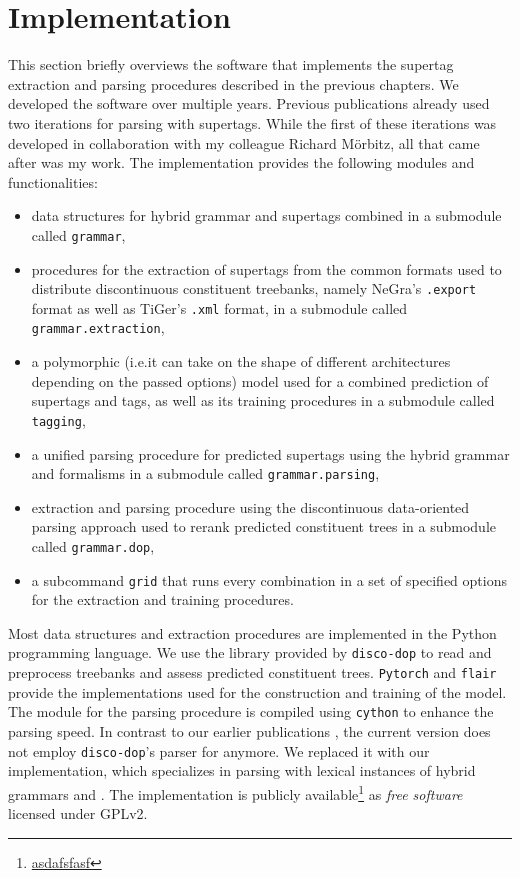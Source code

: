 \documentclass[../../document.tex]{subfiles}
\begin{document}
    \section{Implementation}
    This section briefly overviews the software that implements the supertag extraction and parsing procedures described in the previous chapters.
    We developed the software over multiple years. Previous publications already used two iterations for parsing with  supertags. \citep{RupMoe21,Rup22}
    While the first of these iterations was developed in collaboration with my colleague Richard Mörbitz, all that came after was my work.
    The implementation provides the following modules and functionalities:
    \begin{itemize}
        \item data structures for hybrid grammar and  supertags combined in a submodule called \texttt{grammar},
        \item procedures for the extraction of supertags from the common formats used to distribute discontinuous constituent treebanks, namely NeGra's \texttt{.export} format as well as TiGer's \texttt{.xml} format, in a submodule called \texttt{grammar.extraction},
        \item a polymorphic (i.e.\@ it can take on the shape of different architectures depending on the passed options)  model used for a combined prediction of supertags and  tags, as well as its training procedures in a submodule called \texttt{tagging}, 
        \item a unified parsing procedure for predicted supertags using the hybrid grammar and  formalisms in a submodule called \texttt{grammar.parsing},
        \item extraction and parsing procedure using the discontinuous data-oriented parsing approach used to rerank predicted constituent trees in a submodule called \texttt{grammar.dop},
        \item a subcommand \texttt{grid} that runs every combination in a set of specified options for the extraction and training procedures.
    \end{itemize}
    
    Most data structures and extraction procedures are implemented in the Python programming language.
    We use the library provided by \texttt{disco-dop} \citep{Cra12} to read and preprocess treebanks and assess predicted constituent trees.
    \texttt{Pytorch} \citep{} and \texttt{flair} \citep{} provide the implementations used for the construction and training of the  model.
    The module for the parsing procedure is compiled using \texttt{cython} \citep{} to enhance the parsing speed.
    In contrast to our earlier publications \citet{RupMoe21,Rup22}, the current version does not employ \texttt{disco-dop}'s parser for  anymore.
    We replaced it with our implementation, which specializes in parsing with lexical instances of hybrid grammars and .
    The implementation is publicly available\footnote{\url{asdafsfasf}} as \emph{free software} licensed under GPLv2.
\end{document}
